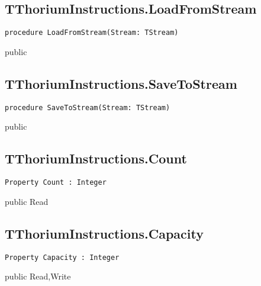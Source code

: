 \subsection{TThoriumInstructions.LoadFromStream}
\label{thoriumcore:thorium:tthoriuminstructions:loadfromstream}
\begin{FPCList}
\Synopsis
\Declaration 

\begin{verbatim}
procedure LoadFromStream(Stream: TStream)
\end{verbatim}
\Visibility
public
\Description
\Errors
\end{FPCList}
\subsection{TThoriumInstructions.SaveToStream}
\label{thoriumcore:thorium:tthoriuminstructions:savetostream}
\begin{FPCList}
\Synopsis
\Declaration 

\begin{verbatim}
procedure SaveToStream(Stream: TStream)
\end{verbatim}
\Visibility
public
\Description
\Errors
\end{FPCList}
\subsection{TThoriumInstructions.Count}
\label{thoriumcore:thorium:tthoriuminstructions:count}
\begin{FPCList}
\Synopsis
\Declaration 

\begin{verbatim}
Property Count : Integer
\end{verbatim}
\Visibility
public
\Access
Read
\Description
\end{FPCList}
\subsection{TThoriumInstructions.Capacity}
\label{thoriumcore:thorium:tthoriuminstructions:capacity}
\begin{FPCList}
\Synopsis
\Declaration 

\begin{verbatim}
Property Capacity : Integer
\end{verbatim}
\Visibility
public
\Access
Read,Write
\Description
\end{FPCList}
